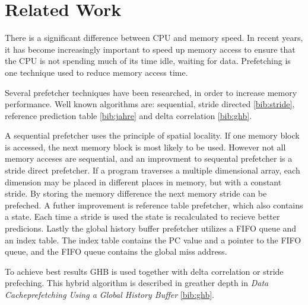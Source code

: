 \section{Related Work}
\label{sec:related-work}

There is a significant difference between CPU and memory speed.
In recent years, it has become increasingly important to speed up memory access to ensure that the CPU is not spending much of its time idle, waiting for data.
Prefetching is one technique used to reduce memory access time.

Several prefetcher techniques have been researched, in order to increase memory performance.
Well known algorithms are: sequential, stride directed \ref{bib:stride}, reference prediction table \ref{bib:jahre} and delta correlation \ref{bib:ghb}.

A sequential prefetcher uses the principle of spatial locality.
If one memory block is accessed, the next memory block is most likely to be used.
However not all memory acceses are sequential,
and an improvment to sequental prefetcher is a stride direct prefetcher.
If a program traverses a multiple dimensional array,
each dimension may be placed in different places in memory,
but with a constant stride.
By storing the memory difference the next memory stride can be prefeched.
A futher improvement is reference table prefetcher,
which also contains a state.
Each time a stride is used the state is recalculated to recieve better predicions.
Lastly the global history buffer prefetcher utilizes a FIFO queue and an index table.
The index table contains the PC value and a pointer to the FIFO queue,
and the FIFO queue contains the global miss address.

To achieve best results GHB is used together with delta correlation or stride prefeching.
This hybrid algorithm is described in greather depth in \textit{Data Cacheprefetching Using a Global History Buffer} \ref{bib:ghb}.
